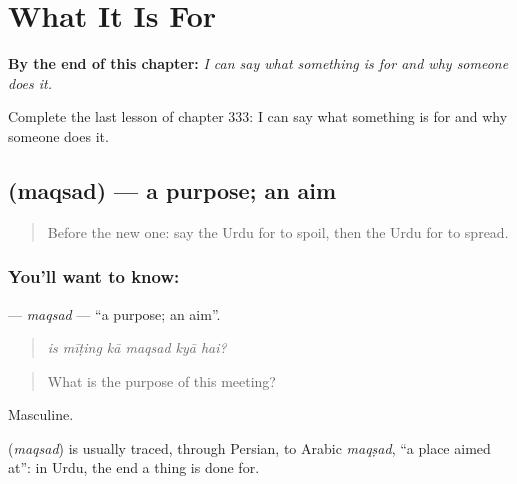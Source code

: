
\chapter{What It Is For}
\label{ch:ur-what-it-is-for}

\begin{chapteropening}
\textbf{By the end of this chapter:} \emph{I can say what something is for and why someone does it.}

Complete the last lesson of chapter 333: I can say what something is for and why someone does it.
\end{chapteropening}

\section[\texorpdfstring{\ur{مقصد} (maqsad)}{مقصد (maqsad)}]{ (maqsad) — a purpose; an aim}

\label{lesson:UR-C333-maqsad}



\begin{quote}
Before the new one: say the Urdu for to spoil, then the Urdu for to spread.
\end{quote}

\subsection*{You'll want to know: }
\textbf{} — \emph{maqsad} — \textquotedblleft{}a purpose; an aim\textquotedblright{}.

\begin{quote}
     
\end{quote}

\begin{quote}
\emph{is mīṭing kā maqsad kyā hai?}
\end{quote}

\begin{quote}
What is the purpose of this meeting?
\end{quote}

Masculine.

\begin{cousinweb}
\textbf{} (\emph{maqsad}) is usually traced, through Persian, to Arabic \emph{maqṣad}, \textquotedblleft{}a place aimed at\textquotedblright{}: in Urdu, the end a thing is done for.
\end{cousinweb}

